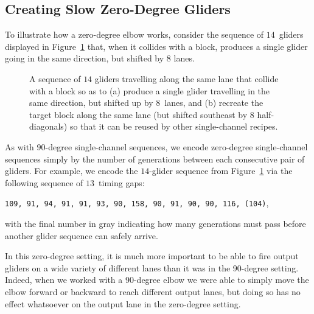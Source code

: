 \subsection{Creating Slow Zero-Degree Gliders}\label{sec:single_channel_zero_make_slow}

To illustrate how a zero-degree elbow works, consider the sequence of $14$~gliders displayed in Figure~\ref{fig:lane_8_0degree} that, when it collides with a block, produces a single glider going in the same direction, but shifted by $8$ lanes.

\begin{figure}[!htb]
	\centering
	\caption{A sequence of $14$ gliders travelling along the same lane that collide with a block so as to (a) produce a single glider travelling in the same direction, but shifted up by $8$~lanes, and (b) recreate the target block along the same lane (but shifted southeast by 8 half-diagonals) so that it can be reused by other single-channel recipes.}\label{fig:lane_8_0degree}
\end{figure}

As with $90$-degree single-channel sequences, we encode zero-degree single-channel sequences simply by the number of generations between each consecutive pair of gliders. For example, we encode the $14$-glider sequence from Figure~\ref{fig:lane_8_0degree} via the following sequence of $13$~timing gaps:
\begin{center}
	\texttt{109, 91, 94, 91, 91, 93, 90, 158, 90, 91, 90, 90, 116, {\color{gray}(104)}},
\end{center}
with the final number in gray indicating how many generations must pass before another glider sequence can safely arrive.

In this zero-degree setting, it is much more important to be able to fire output gliders on a wide variety of different lanes than it was in the 90-degree setting. Indeed, when we worked with a 90-degree elbow we were able to simply move the elbow forward or backward to reach different output lanes, but doing so has no effect whatsoever on the output lane in the zero-degree setting.


